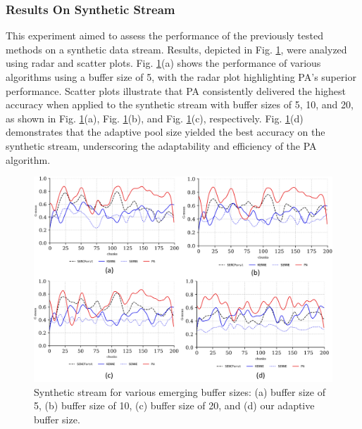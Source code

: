 \subsubsection{Results On Synthetic Stream}
\label{sec:synthetic}
This experiment aimed to assess the performance of the previously tested methods on a synthetic data stream. Results, depicted in Fig. \ref{fig:res3}, were analyzed using radar and scatter plots. Fig. \ref{fig:res3}(a) shows the performance of various algorithms using a buffer size of 5, with the radar plot highlighting PA's superior performance. Scatter plots illustrate that PA consistently delivered the highest accuracy when applied to the synthetic stream with buffer sizes of 5, 10, and 20, as shown in Fig. \ref{fig:res3}(a), Fig. \ref{fig:res3}(b), and Fig. \ref{fig:res3}(c), respectively. Fig. \ref{fig:res3}(d) demonstrates that the adaptive pool size yielded the best accuracy on the synthetic stream, underscoring the adaptability and efficiency of the PA algorithm.

\begin{figure}[!ht]
	\centering
	\includegraphics[width=1\linewidth]{5_Emerging/images/res3.png}
	\caption{Synthetic stream for various emerging buffer sizes: (a) buffer size of 5, (b) buffer size of 10, (c) buffer size of 20, and (d) our adaptive buffer size.}
	\label{fig:res3}
\end{figure}				

